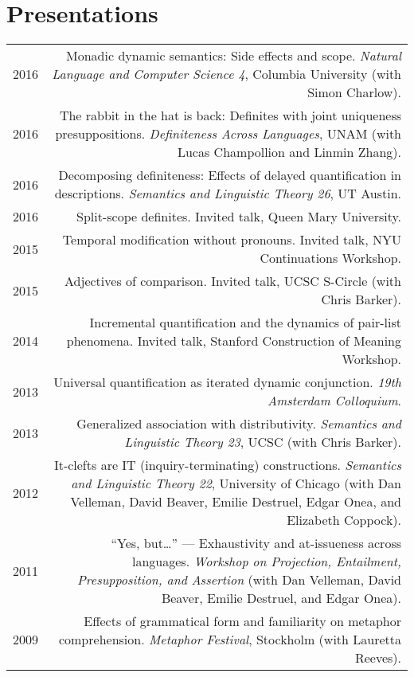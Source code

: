 \documentclass[12pt]{article}
\begin{document}
\bigskip

\section*{Presentations}

\begin{longtable}{LR}
  2016 &  Monadic dynamic semantics: Side effects and scope. \textit{Natural
          Language and Computer Science 4}, Columbia University (with Simon
          Charlow).\\
  2016 &  The rabbit in the hat is back: Definites with joint uniqueness
          presuppositions. \textit{Definiteness Across Languages}, UNAM (with
          Lucas Champollion and Linmin Zhang).\\
  2016 &  Decomposing definiteness: Effects of delayed quantification in
          descriptions. \textit{Semantics and Linguistic Theory 26}, UT Austin.\\
  2016 &  Split-scope definites. Invited talk, Queen Mary University.\\
  2015 &  Temporal modification without pronouns. Invited talk, NYU
          Continuations Workshop.\\
  2015 &  Adjectives of comparison. Invited talk, UCSC S-Circle (with Chris
          Barker).\\
  2014 &  Incremental quantification and the dynamics of pair-list phenomena.
          Invited talk, Stanford Construction of Meaning Workshop.\\
  2013 &  Universal quantification as iterated dynamic conjunction. \textit{19th
          Amsterdam Colloquium}. \\
  2013 &  Generalized association with distributivity. \textit{Semantics and
          Linguistic Theory 23}, UCSC (with Chris Barker).\\
  2012 &  It-clefts are IT (inquiry-terminating) constructions.
          \textit{Semantics and Linguistic Theory 22}, University of Chicago
          (with Dan Velleman, David Beaver, Emilie Destruel, Edgar Onea, and
          Elizabeth Coppock).\\
  2011 &  ``Yes, but\dots'' --- Exhaustivity and at-issueness across languages.
          \textit{Workshop on Projection, Entailment, Presupposition, and
          Assertion} (with Dan Velleman, David Beaver, Emilie Destruel, and
          Edgar Onea).\\
  2009 &  Effects of grammatical form and familiarity on metaphor
          comprehension. \textit{Metaphor Festival}, Stockholm (with Lauretta Reeves).
\end{longtable}
\end{document}
